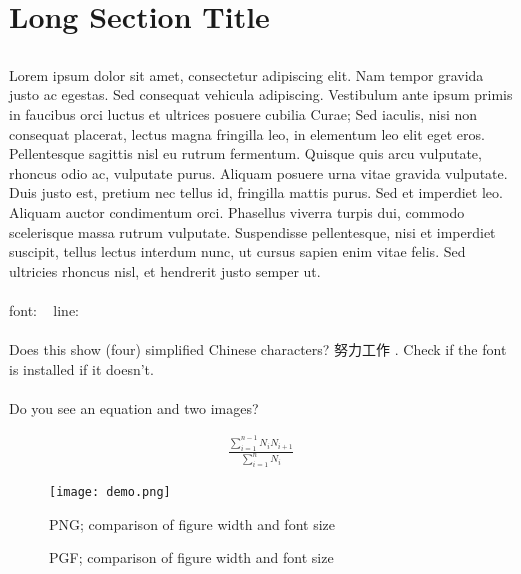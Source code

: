 	\section[Short Section Title]{Long Section Title}
		\begin{multicols}{2}
		\subsection{}
			\paragraph{}
				Lorem ipsum dolor sit amet, consectetur adipiscing elit. Nam tempor gravida justo ac egestas. Sed consequat vehicula adipiscing. Vestibulum ante ipsum primis in faucibus orci luctus et ultrices posuere cubilia Curae; Sed iaculis, nisi non consequat placerat, lectus magna fringilla leo, in elementum leo elit eget eros. Pellentesque sagittis nisl eu rutrum fermentum. Quisque quis arcu vulputate, rhoncus odio ac, vulputate purus. Aliquam posuere urna vitae gravida vulputate. Duis justo est, pretium nec tellus id, fringilla mattis purus. Sed et imperdiet leo. Aliquam auctor condimentum orci. Phasellus viverra turpis dui, commodo scelerisque massa rutrum vulputate. Suspendisse pellentesque, nisi et imperdiet suscipit, tellus lectus interdum nunc, ut cursus sapien enim vitae felis. Sed ultricies rhoncus nisl, et hendrerit justo semper ut.
			\paragraph{}
				font: \fontname\font\ \the\fontdimen6\font
				line: \prntlen{\textwidth} \prntlen{\linewidth}
			\paragraph{}
				Does this show (four) simplified Chinese characters? 努力工作 . Check if the font is installed if it doesn't.
			\paragraph{}
				Do you see an equation and two images?
		\end{multicols}
		
		\begin{equation} \begin{split}
			\frac{\sum_{i=1}^{n-1}N_{i}N_{i+1}}{\sum_{i=1}^{n} N_{i}}
			\label{eq:equation_label}
		\end{split} \end{equation}
		
		\begin{figure}[ht]
			\texttt{[image: demo.png]}
			\caption{PNG; comparison of figure width and font size}
			\label{fig:png_label}
		\end{figure}
		
		\begin{figure}[ht]
			
			\caption{PGF; comparison of figure width and font size}
			\label{fig:pgf_label}
		\end{figure}
		



